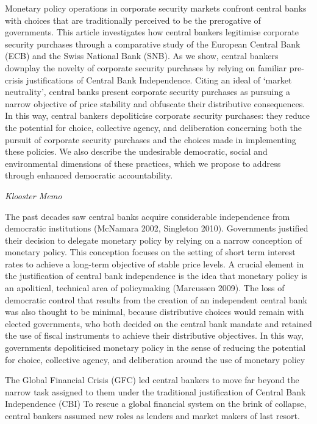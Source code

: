 \documentclass[
]{book}
\begin{document}
Monetary policy operations in corporate security markets confront central
banks with choices that are traditionally perceived to be the prerogative of
governments. This article investigates how central bankers legitimise
corporate security purchases through a comparative study of the
European Central Bank (ECB) and the Swiss National Bank (SNB). As we
show, central bankers downplay the novelty of corporate security
purchases by relying on familiar pre-crisis justifications of Central Bank
Independence. Citing an ideal of `market neutrality', central banks
present corporate security purchases as pursuing a narrow objective of
price stability and obfuscate their distributive consequences. In this way,
central bankers depoliticise corporate security purchases: they reduce
the potential for choice, collective agency, and deliberation concerning
both the pursuit of corporate security purchases and the choices made
in implementing these policies. We also describe the undesirable
democratic, social and environmental dimensions of these practices,
which we propose to address through enhanced democratic
accountability.

\emph{Klooster Memo}

The past decades saw central banks acquire considerable independence from democratic institutions
(McNamara 2002, Singleton 2010). Governments justified their decision to delegate monetary policy
by relying on a narrow conception of monetary policy. This conception focuses on the setting of short
term interest rates to achieve a long-term objective of stable price levels. A crucial element in the
justification of central bank independence is the idea that monetary policy is an apolitical, technical
area of policymaking (Marcussen 2009). The loss of democratic control that results from the creation
of an independent central bank was also thought to be minimal, because distributive choices would
remain with elected governments, who both decided on the central bank mandate and retained the
use of fiscal instruments to achieve their distributive objectives. In this way, governments depoliticised
monetary policy in the sense of reducing the potential for choice, collective agency, and deliberation
around the use of monetary policy

The Global Financial Crisis (GFC) led central bankers to move far beyond the narrow task assigned
to them under the traditional justification of Central Bank Independence (CBI)
To rescue a global financial system on the brink of collapse, central bankers assumed new roles as lenders and market makers of last resort.
\end{document}
